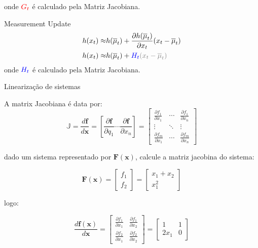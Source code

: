 onde $\color{red}G_t$ é calculado pela Matriz Jacobiana.

Measurement Update
\begin{equation*}
    \begin{split}
        h(x_t) \approx & h(\overline{\mu}_t) + \frac{\partial h(\overline{\mu}_t) }{\partial x_{t}}(x_{t}-\overline{\mu}_{t}) \\
        h(x_t) \approx & h(\overline{\mu}_t) + \color{blue}{H_t}\color{gray}{(x_{t}-\overline{\mu}_{t})}
    \end{split}
\end{equation*}
onde $\color{blue}H_t$ é calculado pela Matriz Jacobiana.


Linearização de sistemas

A matrix Jacobiana é data por:
\begin{equation*}
    \mathbb{J}
    =
    \frac{d \mathbf{f}}{d \mathbf{x}}
    =
    \left[ \frac{\partial \mathbf{f}}{\partial q_1}
        \cdots \frac{\partial \mathbf{f}}{\partial x_n} \right]
    =
    \begin{bmatrix}
        \frac{\partial f_1}{\partial x_1} & \cdots &
        \frac{\partial f_1}{\partial x_n}                   \\
        \vdots                            & \ddots & \vdots \\
        \frac{\partial f_m}{\partial x_1} & \cdots &
        \frac{\partial f_m}{\partial x_n}
    \end{bmatrix}
\end{equation*}
    

dado um sistema representado por $\mathbf{F(x)}$, calcule a
    matriz jacobina do sistema:
    
    \begin{equation*}
        \mathbf{F(x)}
        =
        \begin{bmatrix}
            f_1 \\
            f_2
        \end{bmatrix}
        =
        \begin{bmatrix}
            x_1 + x_2 \\
            x_1^2
        \end{bmatrix}
    \end{equation*}
    
    logo:

    \begin{equation*}
        \frac{d \mathbf{f(x)}}{d \mathbf{x}}
        =
        \begin{bmatrix}
            \frac{\partial f_1}{\partial x_1} &
            \frac{\partial f_1}{\partial x_2} \\
            \frac{\partial f_2}{\partial x_1} &
            \frac{\partial f_2}{\partial x_2}
        \end{bmatrix}
        =
        \begin{bmatrix}
            1 & 1 \\
            2x_1 & 0
        \end{bmatrix}
    \end{equation*}

